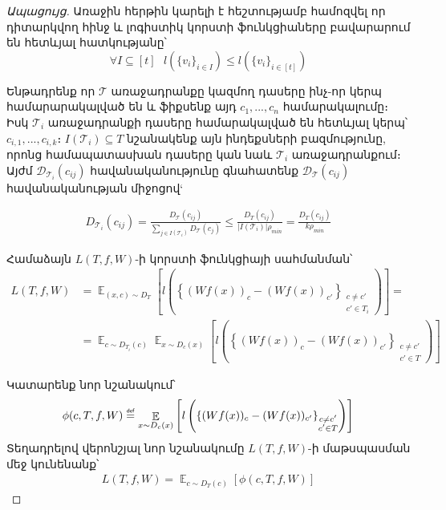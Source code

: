 \documentclass[12pt]{article}
\DeclareMathOperator*{\E}{\mathbb{E}}
\newcommand\defeq{\mathrel{\overset{\makebox[0pt]{\mbox{\normalfont\tiny\sffamily def}}}{=}}}
\begin{document}
\begin{proof}[Ապացույց]

Առաջին հերթին կարելի է հեշտությամբ համոզվել որ դիտարկվող հինջ և լոգիստիկ կորստի ֆունկցիաները բավարարում են հետևյալ հատկությանը՝
\begin{equation}
\label{prop_log_hinge}
\forall I \subseteq [t] \text{   }   l(\{v_i\}_{i\in I}) \leq l(\{v_i\}_{i \in [t]})
\end{equation}


Ենթադրենք որ $\mathcal{T}$  առաջադրանքը կազմող դասերը ինչ-որ կերպ համարարակալված են և ֆիքսենք այդ  $c_1, ..., c_{n}$  համարակալումը։ Իսկ $\mathcal{T}_i$ առաջադրանքի դասերը համարակալված են հետևյալ կերպ՝ $c_{i,1}, ..., c_{i, {k}} $։ $I(\mathcal{T}_i) \subseteq T$  նշանակենք այն ինդեքսների բազմությունը, որոնց համապատասխան դասերը կան նաև $\mathcal{T}_i$ առաջադրանքում։  Այժմ $\mathcal{D}_{\mathcal{T}_i}(c_{ij})$ հավանականությունը գնահատենք $\mathcal{D}_{\mathcal{T}}(c_{ij})$ հավանականության միջոցով`

\begin{align*}
D_{\mathcal{T}_i}(c_{ij}) = \frac{D_\mathcal{T}(c_{ij})}{\sum_{j \in I(\mathcal{T}_i)}D_\mathcal{T}(c_j) } \leq \frac{D_{T}(c_{ij})}{|I(\mathcal{T}_i)|\rho_{min}} = \frac{D_{T}(c_{ij})}{k\rho_{min}}
\end{align*}

Համաձայն $L(T, f, W)$-ի կորստի ֆունկցիայի սահմանման՝
\begin{align*}
L(T, f, W) &= \E_{(x,c) \sim D_{T}} \left [               l \left( \left\{    (Wf(x))_c - (Wf(x))_{c'}     \right\}_{\substack{c \neq c' \\ c'\in T_i}} \right)          \right] = \\
&= \E_{c \sim D_{T_i}(c)}      \E_{x \sim D_{c}(x)}                      \left [               l \left( \left\{    (Wf(x))_c - (Wf(x))_{c'}     \right\}_{\substack{c \neq c' \\ c'\in T}} \right)          \right]
\end{align*}

\noindent Կատարենք նոր նշանակում՝
$$\phi(c, T, f, W) \defeq \E_{x \sim D_{c}(x)}                      \left [               l \left( \left\{    (Wf(x))_c - (Wf(x))_{c'}     \right\}_{\substack{c \neq c' \\ c'\in T}} \right)          \right]$$
Տեղադրելով վերոնշյալ նոր նշանակումը $L(T, f, W)$-ի մաթսպասման մեջ կունենանք՝
\begin{align*}
L(T, f, W) =  \E_{c \sim D_{T}(c)}  \left[ \phi(c, T, f, W) \right ]
\end{align*}


\end{proof}
\end{document}
